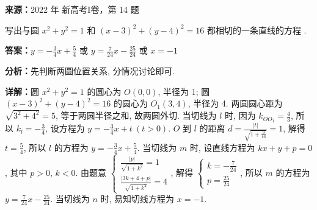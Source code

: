 \begin{question}[points=5]
\textbf{来源：}2022 年 新高考I卷，第 14 题\par
写出与圆 $x^2 + y^2 = 1$ 和 $(x - 3)^2 + (y - 4)^2 = 16$ 都相切的一条直线的方程 .
\fillin[{$y = -\frac{3}{4}x + \frac{5}{4}$ 或 $y = \frac{7}{24}x - \frac{25}{24}$ 或 $x = -1$}]
\begin{solution}
\textbf{答案：}$y = -\frac{3}{4}x + \frac{5}{4}$ 或 $y = \frac{7}{24}x - \frac{25}{24}$ 或 $x = -1$

\textbf{分析：}先判断两圆位置关系, 分情况讨论即可.

\textbf{详解：}圆 $x^2 + y^2 = 1$ 的圆心为 $O(0,0)$, 半径为 1; 圆 $(x - 3)^2 + (y - 4)^2 = 16$ 的圆心为 $O_1(3,4)$, 半径为 4. 两圆圆心距为 $\sqrt{3^2 + 4^2} = 5$, 等于两圆半径之和, 故两圆外切. 当切线为 $l$ 时, 因为 $k_{OO_1} = \frac{4}{3}$, 所以 $k_l = -\frac{3}{4}$, 设方程为 $y = -\frac{3}{4}x + t\ (t > 0)$. $O$ 到 $l$ 的距离 $d = \frac{|t|}{\sqrt{1 + \frac{9}{16}}} = 1$, 解得 $t = \frac{5}{4}$, 所以 $l$ 的方程为 $y = -\frac{3}{4}x + \frac{5}{4}$. 当切线为 $m$ 时, 设直线方程为 $kx + y + p = 0$, 其中 $p > 0$, $k < 0$. 由题意 $\begin{cases} \frac{|p|}{\sqrt{1 + k^2}} = 1 \\ \frac{|3k + 4 + p|}{\sqrt{1 + k^2}} = 4 \end{cases}$, 解得 $\begin{cases} k = -\frac{7}{24} \\ p = \frac{25}{24} \end{cases}$, 所以 $m$ 的方程为 $y = \frac{7}{24}x - \frac{25}{24}$. 当切线为 $n$ 时, 易知切线方程为 $x = -1$.
\end{solution}
\end{question}

